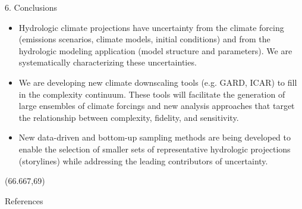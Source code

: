 \documentclass{beamer}
\begin{document}
\begin{frame}{}
\begin{columns}
\begin{column}{.3333\paperwidth}
\begin{textblock}{\textwidth \TPHorizModule}
\begin{block}{6. Conclusions}
\begin{shaded}
      \begin{itemize}         \vspace{1cm}
       \justifying
       \item Hydrologic climate projections have uncertainty from the climate forcing (emissions scenarios, climate models, initial conditions) and from the hydrologic modeling application (model structure and parameters). We are systematically characterizing these uncertainties. \vspace{1cm}
       \item We are developing new climate downscaling tools (e.g. GARD, ICAR) to fill in the complexity continuum. These tools will facilitate the generation of large ensembles of climate forcings and new analysis approaches that target the relationship between complexity, fidelity, and sensitivity. \vspace{1cm}
       \item New data-driven and bottom-up sampling methods are being developed to enable the selection of smaller sets of representative hydrologic projections (storylines) while addressing the leading contributors of uncertainty. \vspace{1cm}

      \end{itemize}

     \end{shaded}



    \end{block}
   \end{textblock}

   \vspace{2cm}

   \begin{textblock}{\textwidth \TPHorizModule}(66.667,69)
    \begin{block}{References}


     \justifying
     

     \small %

    \end{block}
   \end{textblock}


  \end{column}
 \end{columns}
\end{frame}
\end{document}
